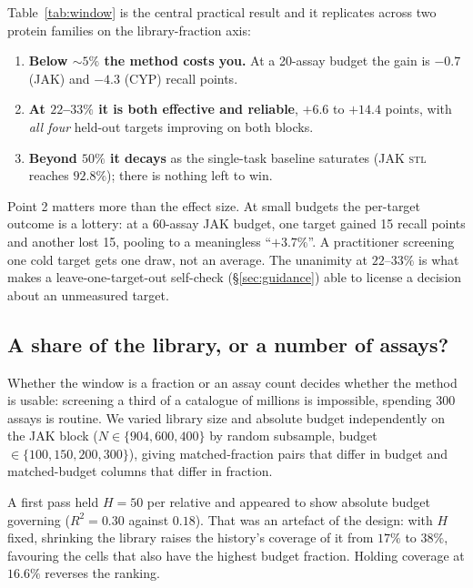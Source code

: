 \documentclass[11pt]{article}
\newcommand{\stl}{\textsc{stl}}
\begin{document}
Table~\ref{tab:window} is the central practical result and it replicates across
two protein families on the library-fraction axis:

\begin{enumerate}[leftmargin=1.6em,itemsep=0.2em]
  \item \textbf{Below ${\sim}5\%$ the method costs you.} At a 20-assay budget
    the gain is $-0.7$ (JAK) and $-4.3$ (CYP) recall points.
  \item \textbf{At $22$--$33\%$ it is both effective and reliable}, $+6.6$ to
    $+14.4$ points, with \emph{all four} held-out targets improving on both
    blocks.
  \item \textbf{Beyond $50\%$ it decays} as the single-task baseline saturates
    (JAK \stl{} reaches $92.8\%$); there is nothing left to win.
\end{enumerate}

Point 2 matters more than the effect size. At small budgets the per-target
outcome is a lottery: at a 60-assay JAK budget, one target gained 15 recall
points and another lost 15, pooling to a meaningless ``$+3.7\%$''. A
practitioner screening one cold target gets one draw, not an average. The
unanimity at $22$--$33\%$ is what makes a leave-one-target-out self-check
(\S\ref{sec:guidance}) able to license a decision about an unmeasured target.

\subsection{A share of the library, or a number of assays?}
\label{sec:scaling}

Whether the window is a fraction or an assay count decides whether the method is
usable: screening a third of a catalogue of millions is impossible, spending
$300$ assays is routine. We varied library size and absolute budget
independently on the JAK block ($N \in \{904, 600, 400\}$ by random subsample,
budget $\in \{100, 150, 200, 300\}$), giving matched-fraction pairs that differ
in budget and matched-budget columns that differ in fraction.

A first pass held $H = 50$ per relative and appeared to show absolute budget
governing ($R^2 = 0.30$ against $0.18$). That was an artefact of the design:
with $H$ fixed, shrinking the library raises the history's coverage of it from
$17\%$ to $38\%$, favouring the cells that also have the highest budget
fraction. Holding coverage at $16.6\%$ reverses the ranking.
\end{document}
